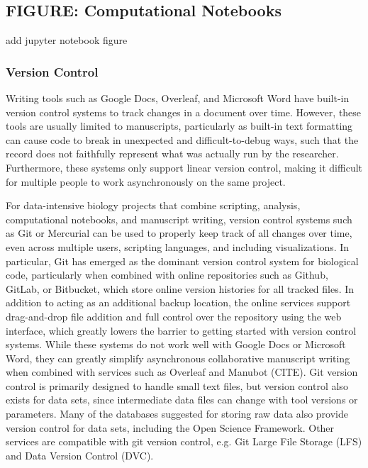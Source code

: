 \documentclass[10pt,letterpaper]{article}
\begin{document}
 
\begin{greybox}{\subsection*{FIGURE: Computational Notebooks}
add jupyter notebook figure
}
\end{greybox}

\subsubsection*{Version Control} 

Writing tools such as Google Docs, Overleaf, and Microsoft Word have built-in version control systems to track changes in a document over time. 
However, these tools are usually limited to manuscripts, particularly as built-in text formatting can cause code to break in unexpected and difficult-to-debug ways, such that the record does not faithfully represent what was actually run by the researcher. 
Furthermore, these systems only support linear version control, making it difficult for multiple people to work asynchronously on the same project. 

For data-intensive biology projects that combine scripting, analysis, computational notebooks, and manuscript writing, version control systems such as Git or Mercurial can be used to properly keep track of all changes over time, even across multiple users, scripting languages, and including visualizations. 
In particular, Git has emerged as the dominant version control system for biological code, particularly when combined with online repositories such as Github, GitLab, or Bitbucket, which store online version histories for all tracked files.
In addition to acting as an additional backup location, the online services support drag-and-drop file addition and full control over the repository using the web interface, which greatly lowers the barrier to getting started with version control systems. 
While these systems do not work well with Google Docs or Microsoft Word, they can greatly simplify asynchronous collaborative manuscript writing when combined with services such as Overleaf and Manubot (CITE). 
Git version control is primarily designed to handle small text files, but version control also exists for data sets, since intermediate data files can change with tool versions or parameters. 
Many of the databases suggested for storing raw data also provide version control for data sets, including the Open Science Framework. 
Other services are compatible with git version control, e.g. Git Large File Storage (LFS) and Data Version Control (DVC).
\end{document}
